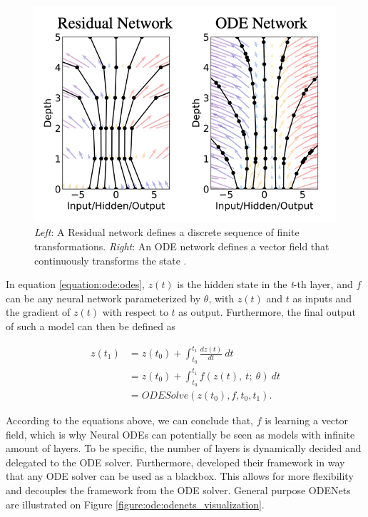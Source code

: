 \begin{figure}[ht]
      \centering
      \includegraphics[width=0.7\columnwidth]{figures/resnet_vs_odes.png}
      \caption{\emph{Left}: A Residual network defines a discrete sequence of finite transformations. \emph{Right}: An ODE network defines a vector field that continuously transforms the state \citep{chen2018neural}.}
      \label{figure:ode:resnet_vs_ode}
\end{figure}

In equation \ref{equation:ode:odes}, $ z(t) $ is the hidden state in the \emph{t}-th layer, and $ f $ can be any neural network parameterized by $ \theta $, with $ z(t) $ and $ t $ as inputs and the gradient of $ z(t) $ with respect to $ t $ as output. Furthermore, the final output of such a model can then be defined as

\begin{align}
    z(t_1) & = z(t_0) + \int_{t_0}^{t_1} \frac{d z(t)}{d t} \ dt \\
    & = z(t_0) + \int_{t_0}^{t_1} f(z(t), \ t; \ \theta ) \ dt \\
    & = ODESolve(z(t_0), f, t_0, t_1).
\end{align}

According to the equations above, we can conclude that, $ f $ is learning a vector field, which is why Neural ODEs can potentially be seen as models with infinite amount of layers. To be specific, the number of layers is dynamically decided and delegated to the ODE solver. Furthermore, \citet{chen2018neural} developed their framework in way that any ODE solver can be used as a blackbox. This allows for more flexibility and decouples the framework from the ODE solver. General purpose ODENets are illustrated on Figure \ref{figure:ode:odenets_visualization}.

